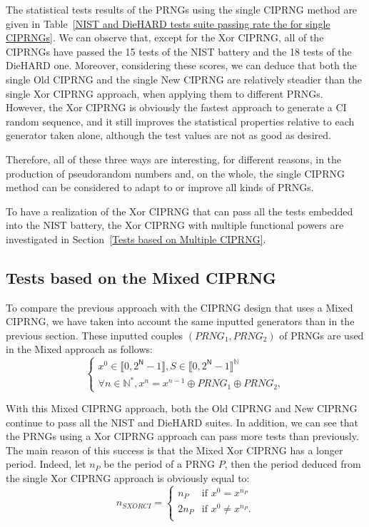 The statistical tests results of the PRNGs using the single CIPRNG method are given in Table~\ref{NIST and DieHARD tests suite passing rate the for single CIPRNGs}.
We can observe that, except for the Xor CIPRNG, all of the CIPRNGs have passed the 15 tests of the NIST battery and the 18 tests of the DieHARD one.
Moreover, considering these scores, we can deduce that both the single Old CIPRNG and the single New CIPRNG are relatively steadier than the single Xor CIPRNG approach, when applying them to different PRNGs.
However, the Xor CIPRNG is obviously the fastest approach to generate a CI random sequence, and it still improves the statistical properties relative to each generator taken alone, although the test values are not as good as desired.

Therefore, all of these three ways are interesting, for different reasons, in the production of pseudorandom numbers and,
on the whole, the single CIPRNG method can be considered to adapt to or improve all kinds of PRNGs.

To have a realization of the Xor CIPRNG that can pass all the tests embedded into the NIST battery, the Xor CIPRNG with multiple functional powers are investigated in Section~\ref{Tests based on Multiple CIPRNG}.



\subsection{Tests based on the Mixed CIPRNG}

To compare the previous approach with the CIPRNG design that uses a Mixed CIPRNG, we have taken into account the same inputted generators than in the previous section.
These inputted couples $(PRNG_1,PRNG_2)$ of PRNGs are used in the Mixed approach as follows:
\begin{equation}
\left\{
\begin{array}{l}
x^0 \in \llbracket 0, 2^\mathsf{N}-1 \rrbracket, S \in \llbracket 0, 2^\mathsf{N}-1 \rrbracket^\mathds{N} \\
\forall n \in \mathds{N}^*, x^n = x^{n-1} \oplus PRNG_1\oplus PRNG_2,
\end{array}
\right.
\label{equation Oplus}
\end{equation}

With this Mixed CIPRNG approach, both the Old CIPRNG and New CIPRNG continue to pass all the NIST and DieHARD suites.
In addition, we can see that the PRNGs using a Xor CIPRNG approach can pass more tests than previously.
The main reason of this success is that the Mixed Xor CIPRNG has a longer period.
Indeed, let $n_{P}$ be the period of a PRNG $P$, then the period deduced from the single Xor CIPRNG approach is obviously equal to:
\begin{equation}
n_{SXORCI}=
\left\{
\begin{array}{ll}
n_{P}&\text{if~}x^0=x^{n_{P}}\\
2n_{P}&\text{if~}x^0\neq x^{n_{P}}.\\
\end{array}
\right.
\label{equation Oplus}
\end{equation}

